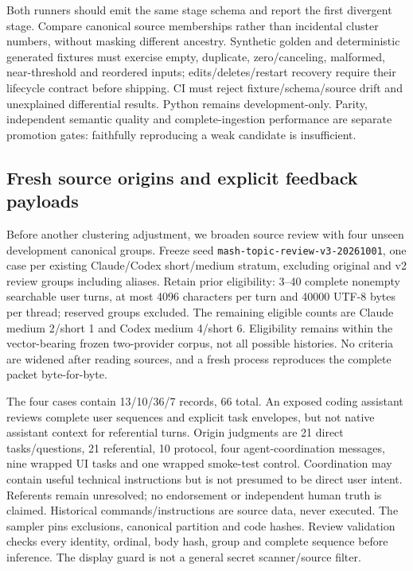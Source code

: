 \documentclass[11pt]{article}
\begin{document}
Both runners should emit the same stage schema and report the first divergent
stage. Compare canonical source memberships rather than incidental cluster
numbers, without masking different ancestry. Synthetic golden and deterministic
generated fixtures must exercise empty, duplicate, zero/canceling, malformed,
near-threshold and reordered inputs; edits/deletes/restart recovery require their
lifecycle contract before shipping. CI must reject fixture/schema/source drift
and unexplained differential results. Python remains development-only. Parity,
independent semantic quality and complete-ingestion performance are separate
promotion gates: faithfully reproducing a weak candidate is insufficient.

\subsection{Fresh source origins and explicit feedback payloads}
Before another clustering adjustment, we broaden source review with four unseen
development canonical groups. Freeze seed \texttt{mash-topic-review-v3-20261001},
one case per existing Claude/Codex short/medium stratum, excluding original and
v2 review groups including aliases. Retain prior eligibility: 3--40 complete
nonempty searchable user turns, at most 4096 characters per turn and 40000 UTF-8
bytes per thread; reserved groups excluded. The remaining eligible counts are
Claude medium 2/short 1 and Codex medium 4/short 6. Eligibility remains within
the vector-bearing frozen two-provider corpus, not all possible histories.
No criteria are widened after reading sources, and a fresh process reproduces
the complete packet byte-for-byte.

The four cases contain 13/10/36/7 records, 66 total. An exposed coding assistant
reviews complete user sequences and explicit task envelopes, but not native
assistant context for referential turns. Origin judgments are 21 direct
tasks/questions, 21 referential, 10 protocol, four agent-coordination messages,
nine wrapped UI tasks and one wrapped smoke-test control. Coordination may
contain useful technical instructions but is not presumed to be direct user
intent. Referents remain unresolved; no endorsement or independent human truth
is claimed. Historical commands/instructions are source data, never executed.
The sampler pins exclusions, canonical partition and code hashes. Review
validation checks every identity, ordinal, body hash, group and complete sequence
before inference. The display guard is not a general secret scanner/source filter.
\end{document}
